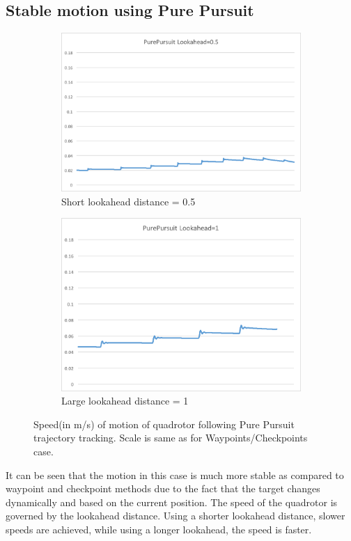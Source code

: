 \documentclass[hidelinks,BTech]{iitmdiss}
\begin{document}
\subsection*{Stable motion using Pure Pursuit}
\begin{figure}[H]
  \centering
  \begin{subfigure}[t]{0.48\textwidth}
  \includegraphics[width=\textwidth]{Pure_Pursuit_speed_0_5.png}
      \caption{Short lookahead distance = 0.5}
  \end{subfigure}
  \begin{subfigure}[t]{0.48\textwidth}
    \centering
      \includegraphics[width=\textwidth]{Pure_Pursuit_speed_1.png}
      \caption{Large lookahead distance = 1}
  \end{subfigure}
  \caption{Speed(in m/s) of motion of quadrotor following Pure Pursuit trajectory tracking. Scale is same as for Waypoints/Checkpoints case.}
\end{figure}
It can be seen that the motion in this case is much more stable as compared to waypoint and checkpoint methods due to the fact that the target changes dynamically and based on the current position. The speed of the quadrotor is governed by the lookahead distance. Using a shorter lookahead distance, slower speeds are achieved, while using a longer lookahead, the speed is faster.
\end{document}

